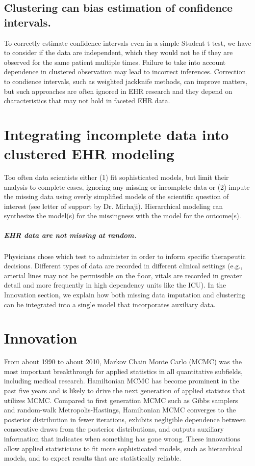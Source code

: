 \documentclass[11pt,notitlepage]{article}
\begin{document}
\subsection*{Clustering can bias estimation of confidence intervals.} To 
correctly estimate confidence intervals even in a simple Student t-test, 
we have to consider if the data are independent, which they would not be if
they are observed for the same patient multiple times. Failure to take into 
account dependence in clustered observation may lead to incorrect inferences. 
Correction to condience intervals, such as weighted jackknife methods, can 
improve matters, but such approaches are often ignored in EHR research 
and they depend on characteristics that may not hold in faceted EHR data. 

\section*{Integrating incomplete data into clustered EHR modeling}
Too often data scientists either (1) fit sophisticated models, but limit their analysis 
to complete cases, ignoring any missing or incomplete data or (2) impute the missing 
data using overly simplified models of the scientific question of interest (see letter of 
support by Dr. Mirhaji). Hierarchical modeling can synthesize the model(s) for the missingness
with the model for the outcome(s).

\subparagraph*{EHR data are not missing at random.}
Physicians chose which test to administer in order
to inform specific therapeutic decisions. Different types of data are recorded 
in different clinical settings (e.g., arterial lines may not be permissible on the 
floor, vitals are recorded in greater detail and more frequently in high dependency 
units like the ICU). In the Innovation section, we explain how both missing data 
imputation and clustering can be integrated into a single model that 
incorporates auxiliary data.

\section*{Innovation}

From about 1990 to about 2010, Markov Chain Monte Carlo (MCMC) was the most
important breakthrough for applied statistics in all quantitative subfields,
including medical research. Hamiltonian MCMC has become prominent in the 
past five years and is likely to drive the next generation of applied
statistcs that utilizes MCMC. Compared to first generation MCMC such as 
Gibbs samplers and random-walk Metropolis-Hastings, Hamiltonian MCMC converges
to the posterior distribution in fewer iterations, exhibits negligible dependence
between consecutive draws from the posterior distributions, and outputs auxiliary
information that indicates when something has gone wrong. These innovations allow
applied statisticians to fit more sophisticated models, such as hierarchical models,
and to expect results that are statistically reliable.
\end{document}
